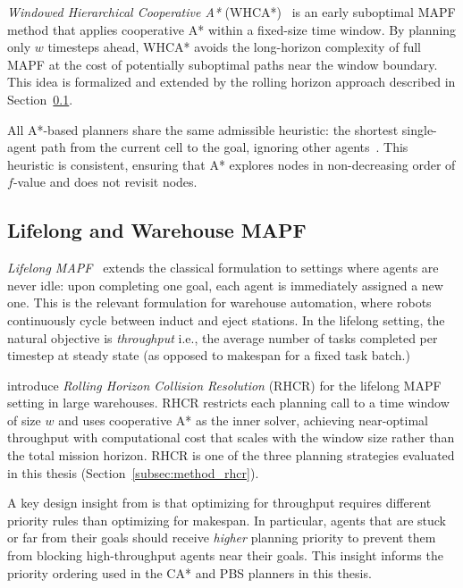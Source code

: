 \emph{Windowed Hierarchical Cooperative A*}
(WHCA*)~\cite{silver2005cooperative} is an early suboptimal MAPF method that
applies cooperative A* within a fixed-size time window.
By planning only $w$ timesteps ahead, WHCA* avoids the long-horizon complexity
of full MAPF at the cost of potentially suboptimal paths near the window
boundary.
This idea is formalized and extended by the rolling horizon approach described
in Section~\ref{subsec:bg_mapf_lifelong}.

All A*-based planners share the same admissible heuristic: the shortest
single-agent path from the current cell to the goal, ignoring other
agents~\cite{hart1968astar}.
This heuristic is consistent, ensuring that A* explores nodes in non-decreasing
order of $f$-value and does not revisit nodes.


\subsection{Lifelong and Warehouse MAPF}
\label{subsec:bg_mapf_lifelong}

\emph{Lifelong MAPF}~\cite{li2021lifelong} extends the classical formulation to
settings where agents are never idle: upon completing one goal, each agent is
immediately assigned a new one.
This is the relevant formulation for warehouse automation, where robots
continuously cycle between induct and eject stations.
In the lifelong setting, the natural objective is \emph{throughput} i.e.,
the average number of tasks completed per timestep at steady state (as opposed to
makespan for a fixed task batch.)

\citet{li2021lifelong} introduce \emph{Rolling Horizon Collision Resolution}
(RHCR) for the lifelong MAPF setting in large warehouses.
RHCR restricts each planning call to a time window of size $w$ and uses
cooperative A* as the inner solver, achieving near-optimal throughput with
computational cost that scales with the window size rather than the total
mission horizon.
RHCR is one of the three planning strategies evaluated in this thesis
(Section~\ref{subsec:method_rhcr}).

A key design insight from \citet{li2021lifelong} is that optimizing for
throughput requires different priority rules than optimizing for makespan.
In particular, agents that are stuck or far from their goals should receive
\emph{higher} planning priority to prevent them from blocking high-throughput
agents near their goals.
This insight informs the priority ordering used in the CA* and PBS planners
in this thesis.


